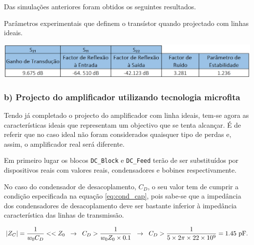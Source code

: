 \documentclass[11pt]{article}
\numberwithin{equation}{section}
\begin{document}
Das simulações anteriores foram obtidos os seguintes resultados.

\begin{table}[H]
	\centering
	\caption{Parâmetros experimentais que definem o transístor quando projectado com linhas ideais.}
	\vspace{-1.5mm}
	\includegraphics[keepaspectratio=true, scale=0.45]{exps/pergunta4}
\end{table}


\subsubsection{b) Projecto do amplificador utilizando tecnologia microfita}

Tendo já completado o projecto do amplificador com linha ideais, tem-se agora as características ideais que representam um objectivo que se tenta alcançar. É de referir que no caso ideal não foram considerados quaisquer tipo de perdas e, assim, o amplificador real será diferente.

Em primeiro lugar os blocos \texttt{DC\_Block} e \texttt{DC\_Feed} terão de ser substituídos por dispositivos reais com valores reais, condensadores e bobines respectivamente. 

No caso do condensador de desacoplamento, $C_{D}$, o seu valor tem de cumprir a condição especificada na equação \ref{eq:cond_cap}, pois sabe-se que a impedância dos condensadores de desacoplamento deve ser bastante inferior à impedância característica das linhas de transmissão. 

\vspace{-3mm}
\begin{equation}
\lvert Z_C \rvert = \frac{1}{w_{0} C_{D}} << Z_0 \hspace{2mm} \rightarrow \hspace{2mm} C_{D} > \frac{1}{w_{0}Z_0 \times 0.1} \hspace{2mm} \rightarrow \hspace{2mm} C_{D} > \dfrac{1}{5 \times 2 \pi \times 22 \times 10^{9}} = 1.45~\text{pF}.
\label{eq:cond_cap}
\end{equation}
\end{document}
